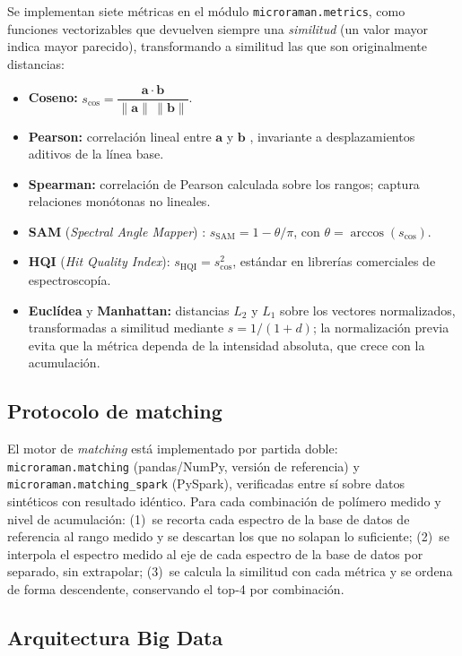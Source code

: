 Se implementan siete métricas en el módulo \texttt{microraman.metrics}, como funciones vectorizables que devuelven siempre una \textit{similitud} (un valor mayor indica mayor parecido), transformando a similitud las que son originalmente distancias:

\begin{itemize}
    \item \textbf{Coseno:} $s_{\cos} = \dfrac{\mathbf{a}\cdot\mathbf{b}}{\lVert\mathbf{a}\rVert\,\lVert\mathbf{b}\rVert}$.
    \item \textbf{Pearson:} correlación lineal entre $\mathbf{a}$ y $\mathbf{b}$ \citep{rodgers1988thirteen}, invariante a desplazamientos aditivos de la línea base.
    \item \textbf{Spearman:} correlación de Pearson calculada sobre los rangos; captura relaciones monótonas no lineales.
    \item \textbf{SAM} (\textit{Spectral Angle Mapper}) \citep{kruse1993sips}: $s_{\text{SAM}} = 1 - \theta/\pi$, con $\theta = \arccos(s_{\cos})$.
    \item \textbf{HQI} (\textit{Hit Quality Index}): $s_{\text{HQI}} = s_{\cos}^{2}$, estándar en librerías comerciales de espectroscopía.
    \item \textbf{Euclídea} y \textbf{Manhattan:} distancias $L_2$ y $L_1$ sobre los vectores normalizados, transformadas a similitud mediante $s = 1/(1+d)$; la normalización previa evita que la métrica dependa de la intensidad absoluta, que crece con la acumulación.
\end{itemize}

\subsection{Protocolo de matching}

El motor de \textit{matching} está implementado por partida doble: \texttt{microraman.matching} (pandas/NumPy, versión de referencia) y \texttt{microraman.matching\_spark} (PySpark), verificadas entre sí sobre datos sintéticos con resultado idéntico. Para cada combinación de polímero medido y nivel de acumulación: (1)~se recorta cada espectro de la base de datos de referencia al rango medido y se descartan los que no solapan lo suficiente; (2)~se interpola el espectro medido al eje de cada espectro de la base de datos por separado, sin extrapolar; (3)~se calcula la similitud con cada métrica y se ordena de forma descendente, conservando el top-4 por combinación.

\subsection{Arquitectura Big Data}

